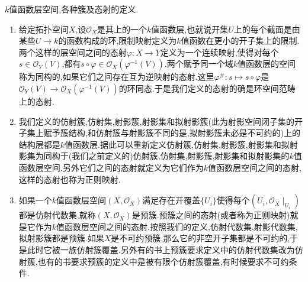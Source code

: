 $k$值函数层空间,各种簇及态射的定义.
\begin{enumerate}
	\item 给定拓扑空间$X$,设$\mathscr{O}_X$是其上的一个$k$值函数层,也就说开集$U$上的每个截面是由某些$U\to k$的函数构成的环,限制映射定义为$k$值函数在更小的开子集上的限制.两个这样的层空间之间的态射$\varphi:X\to Y$定义为一个连续映射,使得对每个$s\in\mathscr{O}_Y(V)$,都有$s\circ\varphi\in\mathscr{O}_X(\varphi^{-1}(V))$.两个赋予同一个域$k$值函数层的空间称为同构的,如果它们之间存在互为逆映射的态射.这里$\varphi^{\#}:s\mapsto s\circ\varphi$是$\mathscr{O}_Y(V)\to\mathscr{O}_X(\varphi^{-1}(V))$的环同态.于是我们定义的态射的确是环空间范畴上的态射.
	\item 我们定义的仿射簇,仿射集,射影簇,射影集和拟射影簇(此为射影空间闭子集的开子集上赋予簇结构,和仿射簇与射影簇不同的是,拟射影簇未必是不可约的)上的结构层都是$k$值函数层.据此可以重新定义仿射簇,仿射集,射影簇,射影集和拟射影集为同构于(我们之前定义的)仿射簇,仿射集,射影簇,射影集和拟射影集的$k$值函数层空间.另外它们之间的态射就定义为它们作为$k$值函数层空间之间的态射,这样的态射也称为正则映射.
	\item 如果一个$k$值函数层空间$(X,\mathscr{O}_X)$满足存在开覆盖$\{U_i\}$使得每个$(U_i,\mathscr{O}_X\mid_{U_i})$都是仿射代数集,就称$(X,\mathscr{O}_X)$是预簇.预簇之间的态射(或者称为正则映射)就是它作为$k$值函数层空间之间的态射.按照我们的定义,仿射代数集,射影代数集,拟射影簇都是预簇.如果$X$是不可约预簇,那么它的非空开子集都是不可约的,于是此时它被一族仿射簇覆盖.另外有的书上预簇要求定义中的仿射代数集改为仿射簇,也有的书要求预簇的定义中是被有限个仿射簇覆盖,有时候要求不可约条件.
\end{enumerate}

